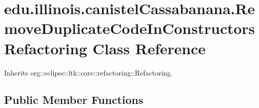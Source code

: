 \hypertarget{classedu_1_1illinois_1_1canistelCassabanana_1_1RemoveDuplicateCodeInConstructorsRefactoring}{
\section{edu.illinois.canistelCassabanana.RemoveDuplicateCodeInConstructorsRefactoring Class Reference}
\label{classedu_1_1illinois_1_1canistelCassabanana_1_1RemoveDuplicateCodeInConstructorsRefactoring}
}


Inherits org::eclipse::ltk::core::refactoring::Refactoring.

\subsection*{Public Member Functions}
